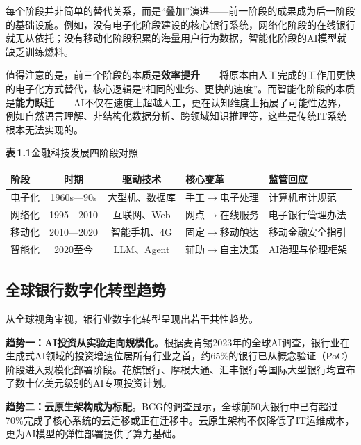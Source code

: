 每个阶段并非简单的替代关系，而是``叠加''演进——前一阶段的成果成为后一阶段的基础设施。例如，没有电子化阶段建设的核心银行系统，网络化阶段的在线银行就无从依托；没有移动化阶段积累的海量用户行为数据，智能化阶段的AI模型就缺乏训练燃料。

值得注意的是，前三个阶段的本质是\textbf{效率提升}——将原本由人工完成的工作用更快的电子化方式替代，核心逻辑是``相同的业务、更快的速度''。而智能化阶段的本质是\textbf{能力跃迁}——AI不仅在速度上超越人工，更在认知维度上拓展了可能性边界，例如自然语言理解、非结构化数据分析、跨领域知识推理等，这些是传统IT系统根本无法实现的。

\vspace{1em}

\noindent\textbf{表\,1.1}\quad 金融科技发展四阶段对照

\vspace{0.5em}

\begin{tabularx}{\textwidth}{l c c X X}
\toprule
\textbf{阶段} & \textbf{时期} & \textbf{驱动技术} & \textbf{核心变革} & \textbf{监管回应} \\
\midrule
电子化 & 1960s—90s & 大型机、数据库 & 手工$\rightarrow$电子处理 & 计算机审计规范 \\
网络化 & 1995—2010 & 互联网、Web & 网点$\rightarrow$在线服务 & 电子银行管理办法 \\
移动化 & 2010—2020 & 智能手机、4G & 固定$\rightarrow$移动触达 & 移动金融安全指引 \\
智能化 & 2020至今 & LLM、Agent & 辅助$\rightarrow$自主决策 & AI治理与伦理框架 \\
\bottomrule
\end{tabularx}

\subsection{全球银行数字化转型趋势}

从全球视角审视，银行业数字化转型呈现出若干共性趋势。

\textbf{趋势一：AI投资从实验走向规模化}。根据麦肯锡2023年的全球AI调查，银行业在生成式AI领域的投资增速位居所有行业之首，约65\%的银行已从概念验证（PoC）阶段进入规模化部署阶段\parencite{mckinsey2023ai}。花旗银行、摩根大通、汇丰银行等国际大型银行均宣布了数十亿美元级别的AI专项投资计划。

\textbf{趋势二：云原生架构成为标配}。BCG的调查显示，全球前50大银行中已有超过70\%完成了核心系统的云迁移或正在迁移中\parencite{bcg2023retail}。云原生架构不仅降低了IT运维成本，更为AI模型的弹性部署提供了算力基础。

